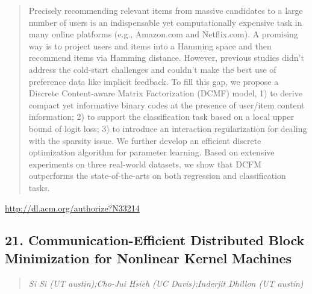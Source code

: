 \documentclass{article}
\begin{document}
\begin{quote}
Precisely recommending relevant items from massive candidates to a large number of users is an indispensable yet computationally expensive task in many online platforms (e.g., Amazon.com and Netflix.com). A promising way is to project users and items into a Hamming space and then recommend items via Hamming distance. However, previous studies didn’t address the cold-start challenges and couldn’t make the best use of preference data like implicit feedback. To fill this gap, we propose a Discrete Content-aware Matrix Factorization (DCMF) model, 1) to derive compact yet informative binary codes at the presence of user/item content information; 2) to support the classification task based on a local upper bound of logit loss; 3) to introduce an interaction regularization for dealing with the sparsity issue. We further develop an efficient discrete optimization algorithm for parameter learning. Based on extensive experiments on three real-world datasets, we show that DCFM outperforms the state-of-the-arts on both regression and classification tasks.
\end{quote}

\href{http://dl.acm.org/authorize?N33214}{http://dl.acm.org/authorize?N33214}

\subsection{21. Communication-Efficient Distributed Block Minimization for Nonlinear Kernel Machines}

\begin{quote}
\footnotesize{\textit{Si Si (UT austin);Cho-Jui Hsieh (UC Davis);Inderjit Dhillon (UT austin)}}

\end{quote}
\end{document}

